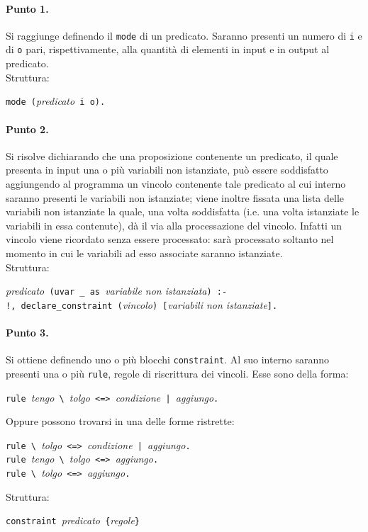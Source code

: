 \documentclass[12pt,a4paper,openright,twoside]{report}
\begin{document}
\paragraph{Punto 1.}
Si raggiunge definendo il \verb"mode" di un predicato. Saranno presenti un numero di \verb"i" e di \verb"o" pari, rispettivamente, alla quantità di elementi in input e in output al predicato.\\
Struttura:
\begin{center}
\verb"mode ("\textit{predicato}\verb" i o)."
\end{center}

\paragraph{Punto 2.}
Si risolve dichiarando che una proposizione contenente un predicato, il quale presenta in input una o più variabili non istanziate, può essere soddisfatto aggiungendo al programma un vincolo contenente tale predicato al cui interno saranno presenti le variabili non istanziate; viene inoltre fissata una lista delle variabili non istanziate la quale, una volta soddisfatta (i.e. una volta istanziate le variabili in essa contenute), dà il via alla processazione del vincolo. Infatti un vincolo viene ricordato senza essere processato: sarà processato soltanto nel momento in cui le variabili ad esso associate saranno istanziate.\\
Struttura:
\begin{center}
\textit{predicato}\verb" (uvar _ as "\textit{variabile non istanziata}\verb") :-"\\
\verb"!, declare_constraint ("\textit{vincolo}\verb") ["\textit{variabili non istanziate}\verb"]."
\end{center}

\paragraph{Punto 3.}
Si ottiene definendo uno o più blocchi \verb"constraint". Al suo interno saranno presenti una o più \verb"rule", regole di riscrittura dei vincoli. Esse sono della forma:
\begin{center}
 \verb"rule "\textit{tengo}\verb" \ "\textit{tolgo}\verb" <=> "\textit{condizione}\verb" | "\textit{aggiungo}\verb"."
\end{center}
Oppure possono trovarsi in una delle forme ristrette:
\begin{center}
 \verb"rule \ "\textit{tolgo}\verb" <=> "\textit{condizione}\verb" | "\textit{aggiungo}\verb"."\\
 \verb"rule "\textit{tengo}\verb" \ "\textit{tolgo}\verb" <=> "\textit{aggiungo}\verb"."\\
 \verb"rule \ "\textit{tolgo}\verb" <=> "\textit{aggiungo}\verb"."\\
\end{center}
Struttura:
\begin{center}
 \verb"constraint "\textit{predicato}\verb" {"\textit{regole}\verb"}"
\end{center}
\end{document}
